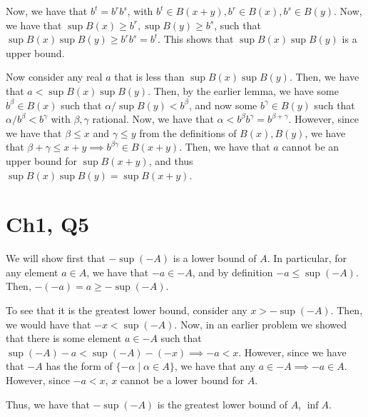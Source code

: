 \documentclass[12pt,letterpaper]{article}
\theoremstyle{definition}
\begin{document}
Now, we have that $b^t = b^rb^s$, with $b^t \in B(x+y), b^r \in B(x), b^s \in
B(y)$. Now, we have that $\sup B(x) \geq b^r, \sup B(y) \geq b^s$, such that
$\sup B(x) \sup B(y) \geq b^rb^s = b^t$. This shows that $\sup B(x) \sup B(y)$
is a upper bound.


Now consider any real $a$ that is less than $\sup B(x) \sup
B(y)$. Then, we have that $a < \sup B(x) \sup B(y)$. Then, by the earlier
lemma, we have some $b^{\beta} \in B(x)$ such that $\alpha / \sup B(y) <
b^{\beta}$, and now some $b^{\gamma} \in B(y)$ such that $\alpha / b^{\beta} <
b^{\gamma}$ with $\beta, \gamma$ rational. Now, we have that $\alpha < b^\beta
b^\gamma = b^{\beta + \gamma}$. However, since we have that $\beta \leq x$ and
$\gamma \leq y$ from the definitions of $B(x), B(y)$, we have that $\beta +
\gamma \leq x + y \implies b^{\beta\gamma} \in B(x + y)$. Then, we have that $a$
cannot be an upper bound for $\sup B(x + y)$, and thus $\sup B(x) \sup B(y) = \sup B(x + y)$.

\section*{Ch1, Q5}


We will show first that $- \sup(-A)$ is a lower bound of $A$. In particular,
for any element $a \in A$, we have that $-a \in -A$, and by definition $-a \leq
\sup(-A)$. Then, $-(-a) = a \geq -\sup(-A)$. 

To see that it is the greatest lower bound, consider any $x > -\sup(-A)$. Then,
we would have that $-x < \sup(-A)$. Now, in an
earlier problem we showed that there is some element $a \in -A$ such that
$\sup(-A) - a < \sup(-A) - (-x) \implies -a < x$. However, since we have that
$-A$ has the form of $\{ -\alpha \mid \alpha \in A\}$, we have that any $a \in
-A \implies -a \in A$. However, since $-a < x$, $x$ cannot be a lower bound for
$A$.

Thus, we have that $-\sup(-A)$ is the greatest lower bound of $A$, $\inf A$.

\end{document}
